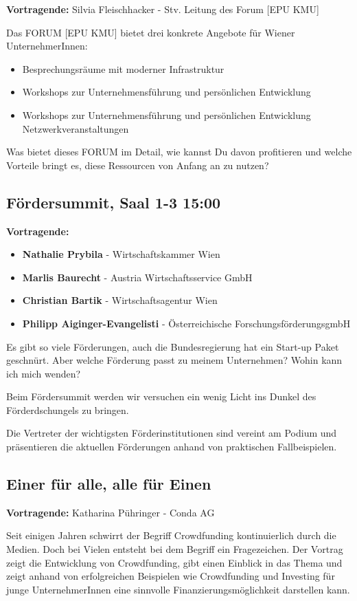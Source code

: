 \textbf{Vortragende:} Silvia Fleischhacker  - Stv. Leitung des Forum [EPU KMU]


Das FORUM [EPU KMU] bietet drei konkrete Angebote für Wiener UnternehmerInnen:
\begin{itemize}
	\item Besprechungsräume mit moderner Infrastruktur
	\item Workshops zur Unternehmensführung und persönlichen Entwicklung
	\item Workshops zur Unternehmensführung und persönlichen Entwicklung
	Netzwerkveranstaltungen 
\end{itemize}

Was bietet dieses FORUM im Detail, wie kannst Du davon profitieren und welche Vorteile bringt es, diese Ressourcen von Anfang an zu nutzen?

\newpage
\subsection{Fördersummit, Saal 1-3 15:00}

\textbf{Vortragende:}
\begin{itemize}
	\item \textbf{Nathalie Prybila} - Wirtschaftskammer Wien
	\item \textbf{Marlis Baurecht} - Austria Wirtschaftsservice GmbH 
	\item \textbf{Christian Bartik} - Wirtschaftsagentur Wien 
	\item \textbf{Philipp Aiginger-Evangelisti} - Österreichische ForschungsförderungsgmbH
\end{itemize}

Es gibt so viele Förderungen, auch die Bundesregierung hat ein Start-up Paket geschnürt. 
Aber welche Förderung passt zu meinem Unternehmen? Wohin kann ich mich wenden?

Beim Fördersummit werden wir versuchen ein wenig Licht ins Dunkel des Förderdschungels zu bringen.

Die Vertreter der wichtigsten Förderinstitutionen sind vereint am Podium und präsentieren die aktuellen Förderungen anhand von praktischen Fallbeispielen.

\subsection{Einer für alle, alle für Einen}
\textbf{Vortragende: } Katharina Pühringer - Conda AG

Seit einigen Jahren schwirrt der Begriff Crowdfunding kontinuierlich durch die Medien. Doch bei Vielen entsteht bei dem Begriff ein Fragezeichen. Der Vortrag zeigt die Entwicklung von Crowdfunding, gibt einen Einblick in das Thema und zeigt anhand von erfolgreichen Beispielen wie Crowdfunding und Investing für junge UnternehmerInnen eine sinnvolle Finanzierungsmöglichkeit darstellen kann. 







